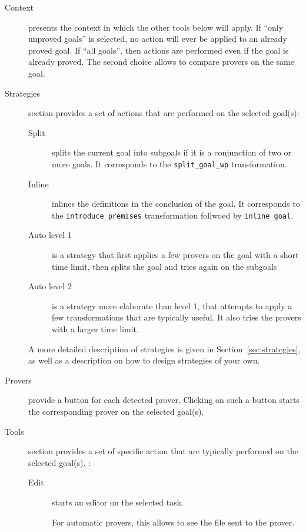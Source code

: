 \begin{description}
\item[Context] presents the context in which the other tools below will
  apply. If ``only unproved goals'' is selected, no action will ever
  be applied to an already proved goal.  If ``all goals'', then
  actions are performed even if the goal is already proved. The second
  choice allows to compare provers on the same goal.

\item[Strategies] section provides a set of actions that are
  performed on the selected goal(s):
  \begin{description}
  \item[Split] splits the current goal into subgoals if it is a
    conjunction of two or more goals. It corresponds to the
    \verb|split_goal_wp| transformation.
  \item[Inline] inlines the definitions in the conclusion of the goal.
    It corresponds to the \verb|introduce_premises| transformation
    follwoed by \verb|inline_goal|.
  \item[Auto level 1] is a strategy that first applies a few provers
    on the goal with a short time limit, then splits the goal and
    tries again on the subgoals
  \item[Auto level 2] is a strategy more elaborate than level 1, that
    attempts to apply a few transformations that are typically
    useful. It also tries the provers with a larger time limit.
  \end{description}
  A more detailed description of strategies is given in
  Section~\ref{sec:strategies}, as well as a description on how to
  design strategies of your own.

\item[Provers] provide a button for each detected prover. Clicking on such a
  button starts the corresponding prover on the selected goal(s).


\item[Tools] section provides a set of specific action that are
  typically performed on the selected goal(s). :
  \begin{description}
\item[Edit] starts an editor on the selected task.

  For automatic provers, this allows to see the file sent to the
  prover.


\end{description}
\end{description}
